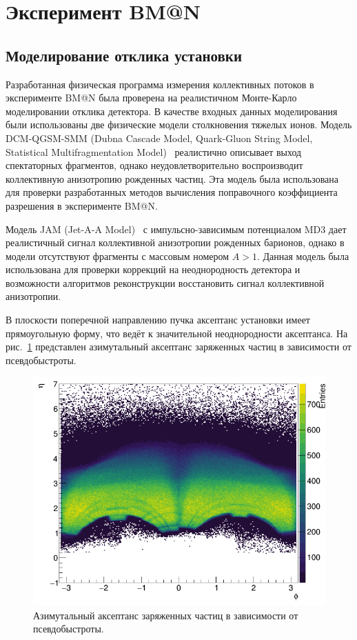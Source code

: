 \section{Эксперимент BM@N}

\subsection{Моделирование отклика установки}

Разработанная физическая программа измерения коллективных потоков в эксперименте BM@N была проверена на реалистичном Монте-Карло моделировании отклика детектора. 
В качестве входных данных моделирования были использованы две физические модели столкновения тяжелых ионов.
Модель DCM-QGSM-SMM (Dubna Cascade Model, Quark-Gluon String Model, Statistical Multifragmentation Model)~\cite{Botvina:1994vj,Baznat:2019iom} реалистично описывает выход спектаторных фрагментов, однако неудовлетворительно воспроизводит коллективную анизотропию рожденных частиц.
Эта модель была использована для проверки разработанных методов вычисления поправочного коэффициента разрешения в эксперименте BM@N.

Модель JAM (Jet-A-A Model)~\cite{Nara:2016hbg,Nara:2019qfd,Nara:2020ztb} с импульсно-зависимым потенциалом MD3 дает реалистичный сигнал коллективной анизотропии рожденных барионов, однако в модели отсутствуют фрагменты с массовым номером $A>1$.
Данная модель была использована для проверки коррекций на неоднородность детектора и возможности алгоритмов реконструкции восстановить сигнал коллективной анизотропии.

В плоскости поперечной направлению пучка аксептанс установки имеет прямоугольную форму, что ведёт к значительной неоднородности аксептанса.
На рис.~\ref{fig:bmn_phi_eta} представлен азимутальный аксептанс заряженных частиц в зависимости от псевдобыстроты. 
%
\begin{figure}[ht]
\begin{center}
\includegraphics[width=0.55\linewidth]{images/bmn_phi_eta.png}
\caption{Азимутальный аксептанс заряженных частиц в зависимости от псевдобыстроты.}
\label{fig:bmn_phi_eta}
\end{center}
\end{figure}

